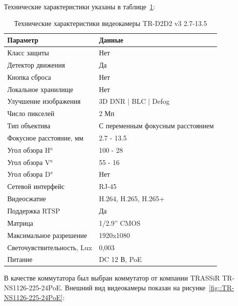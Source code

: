 Технические характеристики указаны в таблице~\ref{tab::tr-d2d2-parameters}:
\begin{longtable}{|p{5cm}|p{12cm}|}
    \caption{Технические характеристики видеокамеры TR-D2D2 v3 2.7-13.5}
    \label{tab::tr-d2d2-parameters} \\

    \hline
    Параметр &
    Данные \\
    \hline
    Класс защиты &
    Нет \\
    \hline
    Детектор движения &
    Да \\
    \hline
    Кнопка сброса &
    Нет \\
    \hline
    Локальное хранилище &
    Нет \\
    \hline
    Улучшение изображения &
    3D DNR | BLC | Defog \\
    \hline
    Число пикселей &
    2 Мп \\
    \hline
    Тип объектива &
    С переменным фокусным расстоянием \\
    \hline
    Фокусное расстояние, мм &
    2.7 - 13.5 \\
    \hline
    Угол обзора H° &
    100 - 28 \\
    \hline
    Угол обзора V° &
    55 - 16 \\
    \hline
    Угол обзора D° &
    Нет \\
    \hline
    Сетевой интерфейс &
    RJ-45 \\
    \hline
    Видеосжатие &
    H.264, H.265, H.265+ \\
    \hline
    Поддержка RTSP &
    Да \\
    \hline
    Матрица &
    1/2.9'' CMOS \\
    \hline
    Максимальное разрешение &
    1920x1080 \\
    \hline
    Светочувствительность, Lux &
    0,003 \\
    \hline
    Питание &
    DC 12 В, PoE \\
    \hline
\end{longtable}

\newpage

В качестве коммутатора был выбран коммутатор от компании TRASSiR TR-NS1126-225-24PoE.
Внешний вид видеокамеры показан на рисунке~\ref{fig::TR-NS1126-225-24PoE}:

